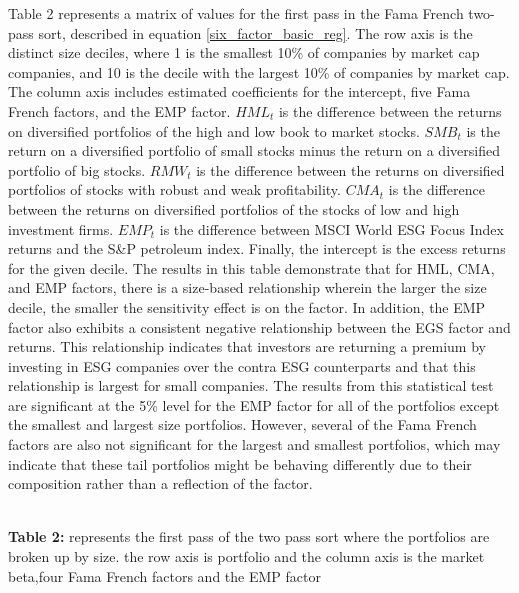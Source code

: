 Table 2 represents a matrix of values for the first pass in the Fama French two-pass sort, described in equation \eqref{six_factor_basic_reg}. The row axis is the distinct size deciles, where 1 is the smallest 10\% of companies by market cap companies, and 10 is the decile with the largest 10\% of companies by market cap. The column axis includes estimated coefficients for the intercept, five Fama French factors, and the EMP factor. $HML_{t}$ is the difference between the returns on diversified portfolios of the high and low book to market stocks.  $SMB_{t}$ is the return on a diversified portfolio of small stocks minus the return on a diversified portfolio of big stocks. $RMW_t$ is the difference between the returns on diversified portfolios of stocks with robust and weak profitability. $CMA_{t}$ is the difference between the returns on diversified portfolios of the stocks of low and high investment firms. $EMP_t$ is the difference between MSCI World ESG Focus Index returns and the S\&P petroleum index. Finally, the intercept is the excess returns for the given decile. The results in this table demonstrate that for HML, CMA, and EMP factors, there is a size-based relationship wherein the larger the size decile, the smaller the sensitivity effect is on the factor. In addition, the EMP factor also exhibits a consistent negative relationship between the EGS factor and returns. This relationship indicates that investors are returning a premium by investing in ESG companies over the contra ESG counterparts and that this relationship is largest for small companies. The results from this statistical test are significant at the 5\% level for the EMP factor for all of the portfolios except the smallest and largest size portfolios. However, several of the Fama French factors are also not significant for the largest and smallest portfolios, which may indicate that these tail portfolios might be behaving differently due to their composition rather than a reflection of the factor. 


\begin{center}
    \paperspacingnarrow
    \\
    \textbf{Table 2:} represents the first pass of the two pass sort where the portfolios are broken up by size. the row axis is portfolio and the column axis is the  market beta,four Fama French factors and the EMP factor\\
    \paperspacingwide
\end{center}

